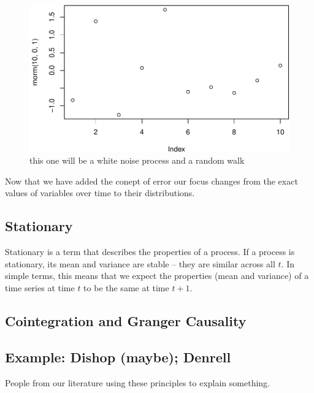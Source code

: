 \documentclass[english,,man]{apa6}
\theoremstyle{definition}
\theoremstyle{definition}
\theoremstyle{definition}
\theoremstyle{remark}
\begin{document}
\begin{figure}
\centering
\includegraphics{figs/unnamed-chunk-8-1.pdf}
\caption{\label{fig:unnamed-chunk-8}this one will be a white noise process
and a random walk\label{noise}}
\end{figure}

Now that we have added the conept of error our focus changes from the
exact values of variables over time to their distributions.

\hypertarget{stationary}{%
\subsection{Stationary}\label{stationary}}

Stationary is a term that describes the properties of a process. If a
process is stationary, its mean and variance are stable -- they are
similar across all \(t\). In simple terms, this means that we expect the
properties (mean and variance) of a time series at time \(t\) to be the
same at time \(t+1\).

\hypertarget{cointegration-and-granger-causality}{%
\subsection{Cointegration and Granger
Causality}\label{cointegration-and-granger-causality}}

\hypertarget{example-dishop-maybe-denrell}{%
\subsection{Example: Dishop (maybe);
Denrell}\label{example-dishop-maybe-denrell}}

People from our literature using these principles to explain something.
\end{document}
